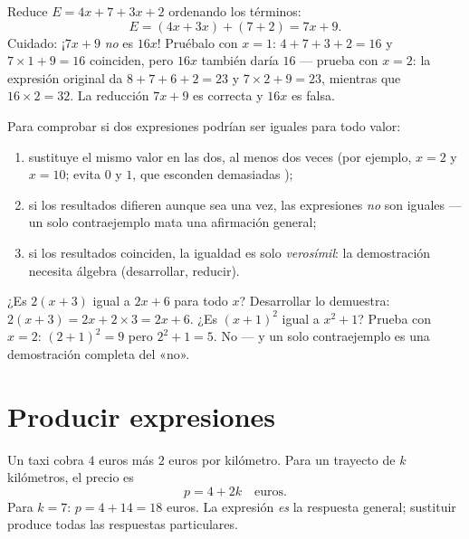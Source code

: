 \begin{example}\label{ex:g7:literal:reduce}
Reduce $E = 4x + 7 + 3x + 2$ ordenando los términos:
\[
E = (4x + 3x) + (7 + 2) = 7x + 9 .
\]
Cuidado: ¡$7x + 9$ \emph{no} es $16x$! Pruébalo con $x = 1$:
$4 + 7 + 3 + 2 = 16$ y $7 \times 1 + 9 = 16$ coinciden, pero $16x$ también
daría $16$ --- prueba con $x = 2$: la expresión original da
$8 + 7 + 6 + 2 = 23$ y $7 \times 2 + 9 = 23$, mientras que
$16 \times 2 = 32$. La reducción $7x + 9$ es correcta y $16x$ es falsa.
\end{example}

\begin{method}\label{met:g7:literal:test}
Para comprobar si dos expresiones podrían ser iguales para todo valor:
\begin{enumerate}
  \item sustituye el mismo valor en las dos, al menos dos veces (por ejemplo,
        $x = 2$ y $x = 10$; evita $0$ y $1$, que esconden demasiadas
        );
  \item si los resultados difieren aunque sea una vez, las expresiones
        \emph{no} son iguales --- un solo contraejemplo mata una afirmación general;
  \item si los resultados coinciden, la igualdad es solo \emph{verosímil}: la
        demostración necesita álgebra (desarrollar, reducir).
\end{enumerate}
\end{method}

\begin{example}\label{ex:g7:literal:test}
¿Es $2(x + 3)$ igual a $2x + 6$ para todo $x$? Desarrollar lo demuestra:
$2(x+3) = 2x + 2 \times 3 = 2x + 6$. ¿Es $(x + 1)^2$ igual a
$x^2 + 1$? Prueba con $x = 2$: $(2+1)^2 = 9$ pero $2^2 + 1 = 5$. No ---
y un solo contraejemplo es una demostración completa del «no».
\end{example}

\section{Producir expresiones}

\begin{example}\label{ex:g7:literal:produce}
Un taxi cobra $4$ euros más $2$ euros por kilómetro. Para un trayecto de
$k$ kilómetros, el precio es
\[
p = 4 + 2k \quad\text{euros}.
\]
Para $k = 7$: $p = 4 + 14 = 18$ euros. La expresión \emph{es} la
respuesta general; sustituir produce todas las respuestas particulares.
\end{example}

